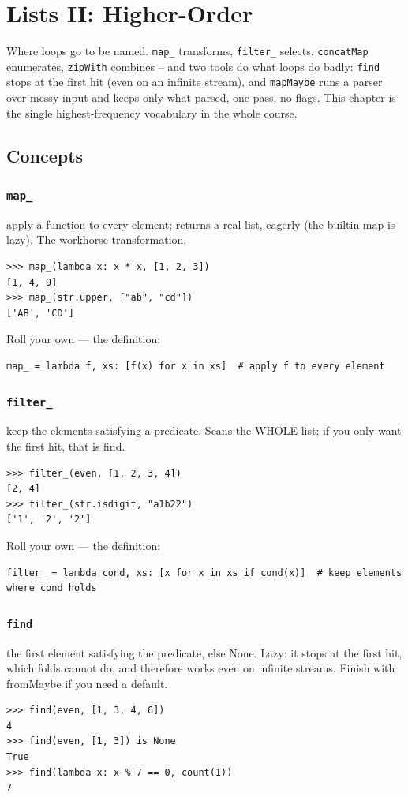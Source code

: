 \documentclass[10pt,letterpaper]{book}
\begin{document}
\chapter{Lists II: Higher-Order}

Where loops go to be named. \texttt{map\_} transforms, \texttt{filter\_}
selects, \texttt{concatMap} enumerates, \texttt{zipWith} combines --
and two tools do what loops do badly: \texttt{find} stops at the first hit
(even on an infinite stream), and \texttt{mapMaybe} runs a parser over messy
input and keeps only what parsed, one pass, no flags. This chapter is the
single highest-frequency vocabulary in the whole course.
\section{Concepts}
\subsection{\texttt{map\_}}\label{def:map-}
apply a function to every element; returns a real list, eagerly (the builtin map is lazy). The workhorse transformation.
\begin{lstlisting}[style=ex]
>>> map_(lambda x: x * x, [1, 2, 3])
[1, 4, 9]
>>> map_(str.upper, ["ab", "cd"])
['AB', 'CD']
\end{lstlisting}

Roll your own --- the definition:

\begin{lstlisting}[style=ex]
map_ = lambda f, xs: [f(x) for x in xs]  # apply f to every element
\end{lstlisting}
\subsection{\texttt{filter\_}}\label{def:filter-}
keep the elements satisfying a predicate. Scans the WHOLE list; if you only want the first hit, that is find.
\begin{lstlisting}[style=ex]
>>> filter_(even, [1, 2, 3, 4])
[2, 4]
>>> filter_(str.isdigit, "a1b22")
['1', '2', '2']
\end{lstlisting}

Roll your own --- the definition:

\begin{lstlisting}[style=ex]
filter_ = lambda cond, xs: [x for x in xs if cond(x)]  # keep elements where cond holds
\end{lstlisting}
\subsection{\texttt{find}}\label{def:find}
the first element satisfying the predicate, else None. Lazy: it stops at the first hit, which folds cannot do, and therefore works even on infinite streams. Finish with fromMaybe if you need a default.
\begin{lstlisting}[style=ex]
>>> find(even, [1, 3, 4, 6])
4
>>> find(even, [1, 3]) is None
True
>>> find(lambda x: x % 7 == 0, count(1))
7
\end{lstlisting}
\end{document}

